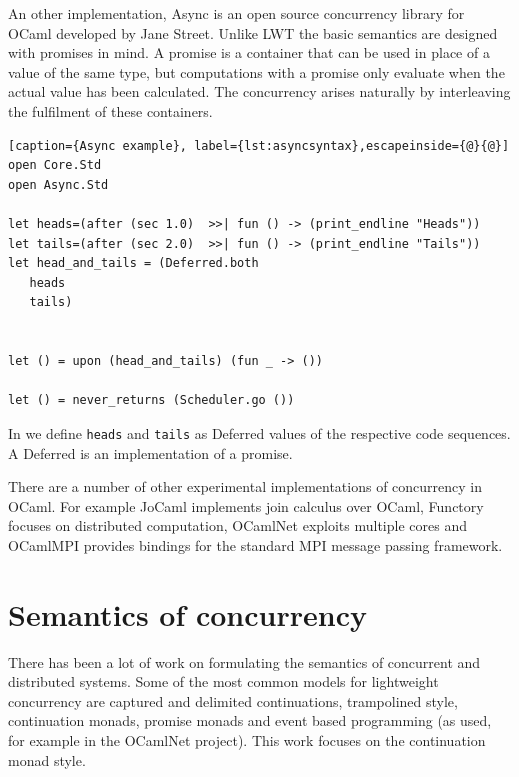\documentclass[12pt,twoside,notitlepage]{report}
\begin{document}
An other implementation, Async is an open source concurrency library for OCaml developed by Jane Street. Unlike LWT the basic semantics are designed with promises in mind. A promise is a container that can be used in place of a value of the same type, but computations with a promise only evaluate when the actual value has been calculated. The concurrency arises naturally by interleaving the fulfilment of these containers. 

\begin{minipage}{\linewidth}
\begin{lstlisting}[caption={Async example}, label={lst:asyncsyntax},escapeinside={@}{@}]
open Core.Std
open Async.Std

let heads=(after (sec 1.0)  >>| fun () -> (print_endline "Heads"))
let tails=(after (sec 2.0)  >>| fun () -> (print_endline "Tails"))
let head_and_tails = (Deferred.both
   heads
   tails)


let () = upon (head_and_tails) (fun _ -> ())
  
let () = never_returns (Scheduler.go ())
\end{lstlisting}
\end{minipage}

In  we define \verb|heads| and \verb|tails| as Deferred values of the respective code sequences. A Deferred is an implementation of a promise.


There are a number of other experimental implementations of concurrency in OCaml. For example JoCaml\cite{jocaml} implements join calculus over OCaml, Functory\cite{functory} focuses on distributed computation, OCamlNet exploits multiple cores and OCamlMPI\cite{ocamlmpi} provides bindings for the standard MPI message passing framework.


\section{Semantics of concurrency}

There has been a lot of work on formulating the semantics of concurrent and distributed systems. Some of the most common models for lightweight concurrency\cite{deleuzelight} are captured\cite{friedman1988applications} and delimited\cite{kiselyov2010delimited} continuations\cite{shan2004shift}, trampolined style\cite{ganz1999trampolined}, continuation monads\cite{Claessen99functionalpearls}, promise monads\cite{liskov1988promises} and event based programming (as used, for example in the OCamlNet\cite{Ocamlnet} project). This work focuses on the continuation monad style.
\end{document}
